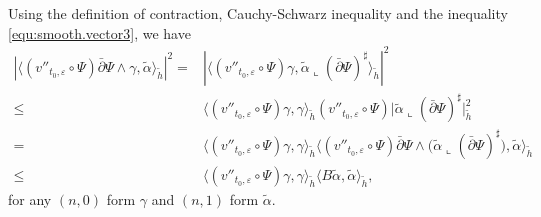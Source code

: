 Using the definition of contraction, Cauchy-Schwarz inequality and
the inequality \ref{equ:smooth.vector3}, we have
\begin{equation}
  \label{eq:eq5.9}
  \begin{split}
  |\langle (v''_{t_{0},\varepsilon}\circ \Psi)\bar\partial\Psi\wedge \gamma,\tilde{\alpha}\rangle_{\tilde{h}}|^{2}
  =&|\langle (v''_{t_{0},\varepsilon}\circ \Psi)
  \gamma,\tilde{\alpha}\llcorner(\bar\partial\Psi)^\sharp\big \rangle_{\tilde{h}}|^{2}
  \\\leq&\langle( v''_{t_{0},\varepsilon}\circ \Psi) \gamma,\gamma\rangle_{\tilde{h}}
  (v''_{t_{0},\varepsilon}\circ \Psi)|\tilde{\alpha}\llcorner(\bar\partial\Psi)^\sharp\big|_{\tilde{h}}^{2}
  \\=&\langle (v''_{t_{0},\varepsilon}\circ \Psi)\gamma,\gamma\rangle_{\tilde{h}}
  \langle (v''_{t_{0},\varepsilon}\circ \Psi) \bar\partial\Psi\wedge
  (\tilde{\alpha}\llcorner(\bar\partial\Psi)^\sharp\big ),\tilde{\alpha}\rangle_{\tilde{h}}
  \\\leq&\langle (v''_{t_{0},\varepsilon}\circ \Psi )\gamma,\gamma\rangle_{\tilde{h}}
  \langle B\tilde{\alpha},\tilde{\alpha}\rangle_{\tilde{h}},
  \end{split}
  \end{equation}
for any $(n,0)$ form $\gamma$ and $(n,1)$ form $\tilde{\alpha}$.

